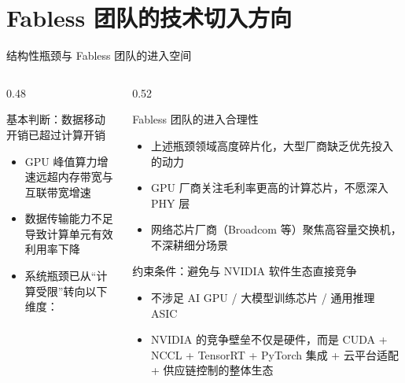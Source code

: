 \documentclass[aspectratio=169, 8pt, UTF8]{ctexbeamer}
\begin{document}
\section{Fabless 团队的技术切入方向}

\begin{frame}{结构性瓶颈与 Fabless 团队的进入空间}
  \begin{columns}[T]
    \begin{column}{0.48\textwidth}
      \begin{alertblock}{基本判断：数据移动开销已超过计算开销}
        \begin{itemize}
          \item GPU 峰值算力增速远超内存带宽与互联带宽增速
          \item 数据传输能力不足导致计算单元有效利用率下降
          \item 系统瓶颈已从``计算受限''转向以下维度：
        \end{itemize}
        \vspace{2pt}
        \centering
        \texttt{%
        \quad
        \quad
        \\[4pt]
        \quad
        \quad
        }
      \end{alertblock}
    \end{column}
    \begin{column}{0.52\textwidth}
      \begin{block}{Fabless 团队的进入合理性}
        \begin{itemize}
          \item 上述瓶颈领域高度碎片化，大型厂商缺乏优先投入的动力
          \item GPU 厂商关注毛利率更高的计算芯片，不愿深入 PHY 层
          \item 网络芯片厂商（Broadcom 等）聚焦高容量交换机，不深耕细分场景
        \end{itemize}
      \end{block}

      \vspace{6pt}

      \begin{alertblock}{约束条件：避免与 NVIDIA 软件生态直接竞争}
        \begin{itemize}
          \item 不涉足 AI GPU / 大模型训练芯片 / 通用推理 ASIC
          \item NVIDIA 的竞争壁垒不仅是硬件，而是 CUDA + NCCL + TensorRT + PyTorch 集成 + 云平台适配 + 供应链控制的整体生态
        \end{itemize}
      \end{alertblock}
    \end{column}
  \end{columns}
\end{frame}
\end{document}
